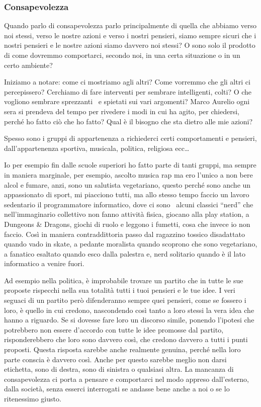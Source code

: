 \documentclass[12pt]{book} %
\begin{document}
\subsubsection{Consapevolezza}
Quando parlo di consapevolezza parlo principalmente di quella che abbiamo verso noi stessi, verso le nostre azioni e
verso i nostri pensieri, siamo sempre sicuri che i nostri pensieri e le nostre azioni siamo davvero noi stessi? O sono
solo il prodotto di come dovremmo comportarci, secondo noi, in una certa situazione o in un certo ambiente? 

Iniziamo a notare: come ci mostriamo agli altri? Come vorremmo che gli altri ci percepissero? Cerchiamo di fare
interventi per sembrare intelligenti, colti? O che vogliono sembrare sprezzanti \ e spietati sui vari argomenti? Marco
Aurelio ogni sera si prendeva del tempo per rivedere i modi in cui ha agito, per chiedersi, perché ho fatto ciò che ho
fatto? Qual è il bisogno che sta dietro alle mie azioni? 

Spesso sono i gruppi di appartenenza a richiederci certi comportamenti e pensieri,
dall'appartenenza sportiva, musicala, politica, religiosa ecc…


\bigskip

Io per esempio fin dalle scuole superiori ho fatto parte di tanti gruppi, ma sempre in maniera marginale, per esempio,
ascolto musica rap ma ero l'unico a non bere alcol e fumare, anzi, sono un salutista vegetariano,
questo perché sono anche un appassionato di sport, mi piacciono tutti, ma allo stesso tempo faccio un lavoro sedentario
il programmatore informatico, dove ci sono \ alcuni classici “nerd” che nell'immaginario
collettivo non fanno attività fisica, giocano alla play station, a Dungeons \& Dragons, giochi di ruolo e leggono i
fumetti, cosa che invece io non faccio. Così in maniera contraddittoria passo dal ragazzino tossico disadattato quando
vado in skate, a pedante moralista quando scoprono che sono vegetariano, a fanatico esaltato quando esco dalla palestra
e, nerd solitario quando è il lato informatico a venire fuori.


\bigskip

Ad esempio nella politica, è improbabile trovare un partito che in tutte le sue proposte rispecchi nella sua totalità
tutti i tuoi pensieri e le tue idee. I veri seguaci di un partito però difenderanno sempre quei pensieri, come se
fossero i loro, è quello in cui credono, nascondendo così tanto a loro stessi la vera idea che hanno a riguardo. Se si
dovesse fare loro un discorso simile, ponendo l'ipotesi che potrebbero non essere
d'accordo con tutte le idee promosse dal partito, risponderebbero che loro sono davvero così, che
credono davvero a tutti i punti proposti. Questa risposta sarebbe anche realmente genuina, perché nella loro parte
conscia è davvero così. Anche per questo sarebbe meglio non darsi etichetta, sono di destra, sono di sinistra o
qualsiasi altra. La mancanza di consapevolezza ci porta a pensare e comportarci nel modo appreso
dall'esterno, dalla società, senza esserci interrogati se andasse bene anche a noi o se lo
ritenessimo giusto.
\end{document}
